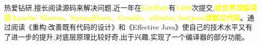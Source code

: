 

\begin{cvparagraph}

热爱钻研,擅长阅读源码来解决问题,近一年在\textcolor{yellow}{\textbf{GitHub}}有\textcolor{yellow}{\textbf{1400}}次提交,\textcolor{yellow}{\textbf{给世界顶级项目Apache Maven、SpringBoot、Gradle、alibaba/fastjson贡献过代码}}。通过阅读《重构:改善既有代码的设计》和《Effective Java》使自己的技术水平又有了进一步的提升,对底层原理比较好奇,出于兴趣,实现了一个编译器的部分功能。

\end{cvparagraph}


